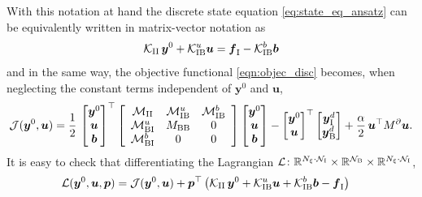 \documentclass[a4paper,10pt]{article}
\newcommand{\cK}{{\mathcal{K}}}
\newcommand{\cM}{{\mathcal{M}}}
\newcommand{\R}{{\mathbb{R}}}
\newcommand{\N}{{\mathcal{N}}}
\numberwithin{theorem}{section}
\begin{document}
With this notation at hand the discrete state equation \eqref{eq:state_eq_ansatz} can be equivalently written in matrix-vector notation as
\begin{equation*}
  \mathcal K_{\textup{II}}\,\boldsymbol{y}^0 + \cK_{\textup{IB}}^u\boldsymbol u 
  =
  \boldsymbol{f}_{\textup{I}} - \cK_{\textup{IB}}^b \boldsymbol b
\end{equation*}
and in the same way, the objective functional \eqref{eqn:objec_disc} becomes, when neglecting the constant terms independent of $\boldsymbol y^0$ and $\boldsymbol u$,
\begin{equation} \label{eq:dicrete_J}
  \mathcal{J}(\boldsymbol{y}^0,\boldsymbol{u})
  =
  \frac12\,\begin{bmatrix}\boldsymbol{y}^0\\ \boldsymbol{u} \\ \boldsymbol{b}\end{bmatrix}^\top
  \left[
  \begin{array}{ccc}
    \cM_{\textup{II}} & \cM_{\textup{IB}}^u & \cM_{\textup{IB}}^b \\
    \cM_{\textup{BI}}^u & M_{\textup{BB}} & 0 \\
	\cM_{\textup{BI}}^b & 0 & 0
  \end{array}
  \right]
  \begin{bmatrix}
    \boldsymbol{y}^0\\ \boldsymbol{u} \\ \boldsymbol{b}
  \end{bmatrix}
  -
  \begin{bmatrix}
    \boldsymbol{y}^0\\ \boldsymbol{u}
  \end{bmatrix}^\top
  \begin{bmatrix}
    \boldsymbol{y}_{\textup{I}}^d \\
    \boldsymbol{y}_{\textup{B}}^d
  \end{bmatrix}
  + \frac\alpha2\,\boldsymbol{u}^\top M^\partial\boldsymbol{u}.
\end{equation}
It is easy to check that differentiating the Lagrangian
$\mathcal L\colon \R^{N_{\xi}\cdot \N_{\textup{I}}} \times \R^{\N_{\textup{B}}} \times \R^{N_{\xi}\cdot \N_{\textup{I}}}$,
\begin{align*}
  \mathcal L(\boldsymbol{y}^0,\boldsymbol{u}, \boldsymbol{p})
  &=
\mathcal{J}(\boldsymbol{y}^0,\boldsymbol{u}) + \boldsymbol{p}^\top\left(\mathcal K_{\textup{II}}\,\boldsymbol{y}^0 + \cK_{\textup{IB}}^u\boldsymbol u + \cK_{\textup{IB}}^b \boldsymbol b - \boldsymbol{f}_{\textup{I}}\right)
\end{align*}
\end{document}
